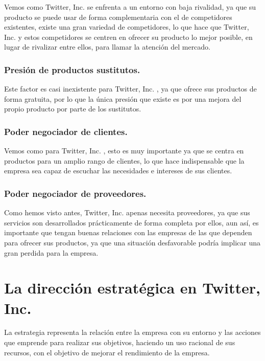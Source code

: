 Vemos como Twitter, Inc. se enfrenta a un entorno con baja rivalidad, ya que su producto se puede usar de forma complementaria con el de competidores existentes, existe una gran variedad de competidores, lo que hace que Twitter, Inc. y estos competidores se centren en ofrecer su producto lo mejor posible, en lugar de rivalizar entre ellos, para llamar la atención del mercado.

\subsubsection{Presión de productos sustitutos.}

Este factor es casi inexistente para Twitter, Inc. , ya que ofrece sus productos de forma gratuita, por lo que la única presión que existe es por una mejora del propio producto por parte de los sustitutos.

\subsubsection{Poder negociador de clientes.}

Vemos como para Twitter, Inc. , esto es muy importante ya que se centra en productos para un amplio rango de clientes, lo que hace indispensable que la empresa sea capaz de escuchar las necesidades e intereses de sus clientes.

\subsubsection{Poder negociador de proveedores.}

Como hemos visto antes, Twitter, Inc. apenas necesita proveedores, ya que sus servicios son desarrollados prácticamente de forma completa por ellos, aun así, es importante que tengan buenas relaciones con las empresas de las que dependen para ofrecer sus productos, ya que una situación desfavorable podría implicar una gran perdida para la empresa.


\newpage


\section{La dirección estratégica en Twitter, Inc.}

La estrategia representa la relación entre la empresa con su entorno y las acciones que emprende para realizar sus objetivos, haciendo un uso racional de sus recursos, con el objetivo de mejorar el rendimiento de la empresa.

